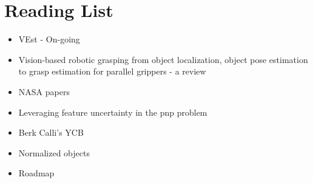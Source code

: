 \documentclass[11pt]{article}
\begin{document}
\section{Reading List}
\begin{itemize}
      \item VEst \cite{dani2009position} - On-going
      \item Vision-based robotic grasping from object localization, object pose
      estimation to grasp estimation for parallel grippers - a review \cite{du2020vision}
      \item NASA papers \cite{NASATech44:online}
      \item Leveraging feature uncertainty in the pnp problem \cite{ferraz2014leveraging}
      \item Berk Calli's YCB \cite{calli2015ycb}
      \item Normalized objects \cite{Wang_2019_CVPR}
      \item Roadmap \cite{roadmap251:online}

\end{itemize}
\end{document}

